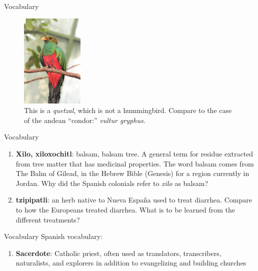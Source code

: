 \documentclass{beamer}
\begin{document}
\begin{frame}{Vocabulary}
\begin{figure}
\includegraphics[width=3cm]{figures/quetzal.jpg}
\caption{This is a \textit{quetzal}, which is not a hummingbird.  Compare to the case of the andean ``condor:'' \textit{vultur gryphus.}}
\end{figure}
\end{frame}

\begin{frame}{Vocabulary}
\small
\begin{enumerate}
\item \textbf{Xilo, xiloxochitl}: balsam, balsam tree.  A general term for residue extracted from tree matter that has medicinal properties.  The word balsam comes from The Balm of Gilead, in the Hebrew Bible (Genesis) for a region currently in Jordan.  Why did the Spanish colonials refer to \textit{xilo} as balsam?
\item \textbf{tzipipatli}: an herb native to Nueva Espa\~{n}a used to treat diarrhea.  Compare to how the Europeans treated diarrhea.  What is to be learned from the different treatments?
\end{enumerate}
\end{frame}

\begin{frame}{Vocabulary}
\small
Spanish vocabulary:
\begin{enumerate}
\item \textbf{Sacerdote}: Catholic priest, often used as translators, transcribers, naturalists, and explorers in addition to evangelizing and building churches
\end{enumerate}
\end{frame}
\end{document}
